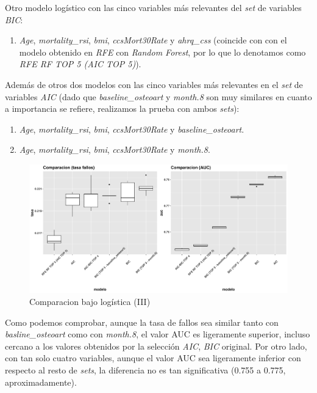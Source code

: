 \documentclass[
]{article}
\providecommand{\tightlist}{%
  \setlength{\itemsep}{0pt}\setlength{\parskip}{0pt}}
\begin{document}
Otro modelo logístico con las cinco variables más relevantes del
\emph{set} de variables \emph{BIC}:

\begin{enumerate}
\def\labelenumi{\arabic{enumi}.}
\setcounter{enumi}{1}
\tightlist
\item
  \emph{Age}, \emph{mortality\_rsi}, \emph{bmi}, \emph{ccsMort30Rate} y
  \emph{ahrq\_css} (coincide con con el modelo obtenido en \emph{RFE}
  con \emph{Random Forest}, por lo que lo denotamos como \emph{RFE RF
  TOP 5 (AIC TOP 5)}).
\end{enumerate}

Además de otros dos modelos con las cinco variables más relevantes en el
\emph{set} de variables \emph{AIC} (dado que \emph{baseline\_osteoart} y
\emph{month.8} son muy similares en cuanto a importancia se refiere,
realizamos la prueba con ambos \emph{sets}):

\begin{enumerate}
\def\labelenumi{\arabic{enumi}.}
\setcounter{enumi}{2}
\tightlist
\item
  \emph{Age}, \emph{mortality\_rsi}, \emph{bmi}, \emph{ccsMort30Rate} y
  \emph{baseline\_osteoart}.
\item
  \emph{Age}, \emph{mortality\_rsi}, \emph{bmi}, \emph{ccsMort30Rate} y
  \emph{month.8}.
\end{enumerate}

\begin{figure}[h!]

{\centering \includegraphics[width=0.99\linewidth,height=0.99\textheight,]{./charts/01_feature_selection_comparacion_final} 

}

\caption{Comparacion bajo logística (III)}\label{fig:unnamed-chunk-42}
\end{figure}

Como podemos comprobar, aunque la tasa de fallos sea similar tanto con
\emph{basline\_osteoart} como con \emph{month.8}, el valor AUC es
ligeramente superior, incluso cercano a los valores obtenidos por la
selección \emph{AIC}, \emph{BIC} original. Por otro lado, con tan solo
cuatro variables, aunque el valor AUC sea ligeramente inferior con
respecto al resto de \emph{sets}, la diferencia no es tan significativa
(0.755 a 0.775, aproximadamente).
\end{document}
